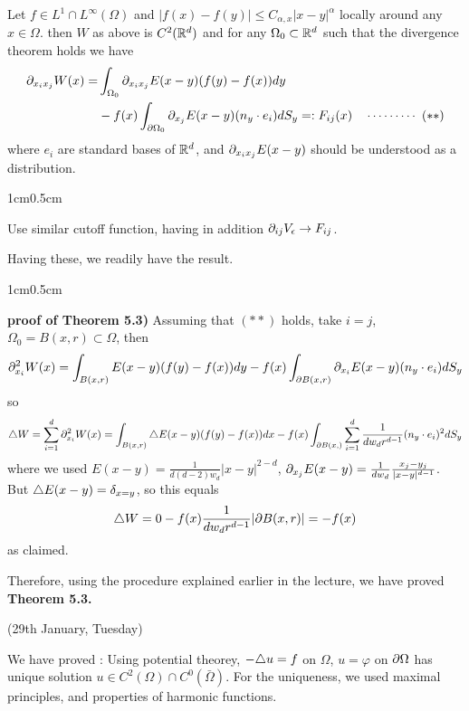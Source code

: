 \documentclass[12pt,a4paper]{article}
\newenvironment{proof}
{\begin{changemargin}{1cm}{0.5cm} 
	}%
	{\end{changemargin}
}
\newenvironment{p}
{\begin{proof} 
	}%
	{\end{proof}
}
\begin{document}
 Let $f\in L^1 \cap L^{\infty}(\Omega)$ and $|f(x)-f(y)|\leq C_{\alpha,x} |x-y|^{\alpha}$ locally around any $x\in \Omega$. then $W$ as above is $C^2(\mathbb{R}^d)$ and for any $\Omega_0 \subset \mathbb{R}^d$ such that the divergence theorem holds we have
\begin{align*}
\partial_{x_i x_j} W(x) = &\int_{\Omega_0} \partial_{x_i x_j} E(x-y) (f(y)- f(x))  dy \\
&- f(x)\int_{\partial \Omega_0} \partial_{x_j} E(x-y) (n_y \cdot e_i) dS_y =: F_{ij}(x) \quad \cdots\cdots\cdots\,\,(**)
\end{align*}
where $e_i$ are standard bases of $\mathbb{R}^d$, and $\partial_{x_i x_j} E(x-y)$ should be understood as a distribution.
\begin{proof}
\pf Use similar cutoff function, having in addition $\partial_{ij} V_{\epsilon} \rightarrow F_{ij}$. 
\end{proof}
\s

Having these, we readily have the result.
\s

\begin{p}
\textbf{proof of Theorem 5.3)} Assuming that $(**)$ holds, take $i=j$, $\Omega_0 = B(x,r) \subset \Omega$, then
\begin{align*}
\partial_{x_i}^2 W(x) = \int_{B(x,r)} E(x-y) (f(y)- f(x))dy - f(x) \int_{\partial B(x,r)} \partial_{x_i} E(x-y)(n_y \cdot e_i) dS_y
\end{align*}
so
\begin{align*}
\triangle W = \sum_{i=1}^d \partial_{x_i}^2 W(x) = \int_{B(x,r)} \triangle E(x-y) (f(y)- f(x))dx - f(x) \int_{\partial B(x,)} \sum_{i=1}^d \frac{1}{dw_d r^{d-1}} (n_y \cdot e_i)^2 dS_y
\end{align*}
where we used $E(x-y) = \frac{1}{d(d-2)w_d}|x-y|^{2-d}$, $\partial_{x_j} E(x-y) = \frac{1}{dw_d} \frac{x_j - y_j}{|x-y|^{d-1}}$. But $\triangle E(x-y) = \delta_{x=y}$, so this equals
\begin{align*}
\triangle W = 0 - f(x)\frac{1}{d w_d r^{d-1}} |\partial B(x,r)| = -f(x)
\end{align*}
as claimed.
\s

Therefore, using the procedure explained earlier in the lecture, we have proved \textbf{Theorem 5.3.}

\eop
\end{p}
\s

\newday

(29th January, Tuesday)
\s

We have proved : Using potential theorey, $-\triangle u =f$ on $\Omega$, $u= \varphi$ on $\partial \Omega$ has unique solution $u\in C^2(\Omega) \cap C^0(\bar{\Omega})$. For the uniqueness, we used maximal principles, and properties of harmonic functions.
\s
\end{document}
